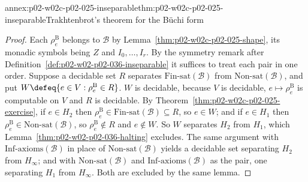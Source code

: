 \begin{annexitem}{annex:p02-w02c-p02-025-inseparable}{thm:p02-w02c-p02-025-inseparable}{Trakhtenbrot's theorem for the B\"uchi form}
\begin{proof}
Each \(\rho^{\mathrm B}_e\) belongs to \(\mathcal B\) by
Lemma~\ref{thm:p02-w02c-p02-025-shape}, its monadic symbols being \(Z\) and
\(I_0,\ldots,I_r\).  By the symmetry remark after
Definition~\ref{def:p02-w02-p02-036-inseparable} it suffices to treat each pair
in one order.  Suppose a decidable set \(R\) separates
\(\mathrm{Fin\text{-}sat}(\mathcal B)\) from \(\mathrm{Non\text{-}sat}(\mathcal B)\),
and put \(W\defeq\{e\in V:\rho^{\mathrm B}_e\in R\}\).  \(W\) is decidable,
because \(V\) is decidable, \(e\mapsto\rho^{\mathrm B}_e\) is computable on \(V\)
and \(R\) is decidable.  By Theorem~\ref{thm:p02-w02c-p02-025-exercise}, if
\(e\in H_2\) then \(\rho^{\mathrm B}_e\in\mathrm{Fin\text{-}sat}(\mathcal B)
\subseteq R\), so \(e\in W\); and if \(e\in H_1\) then
\(\rho^{\mathrm B}_e\in\mathrm{Non\text{-}sat}(\mathcal B)\), so
\(\rho^{\mathrm B}_e\notin R\) and \(e\notin W\).  So \(W\) separates \(H_2\) from
\(H_1\), which Lemma~\ref{thm:p02-w02-p02-036-halting} excludes.  The same
argument with \(\mathrm{Inf\text{-}axioms}(\mathcal B)\) in place of
\(\mathrm{Non\text{-}sat}(\mathcal B)\) yields a decidable set separating \(H_2\)
from \(H_\infty\); and with \(\mathrm{Non\text{-}sat}(\mathcal B)\) and
\(\mathrm{Inf\text{-}axioms}(\mathcal B)\) as the pair, one separating \(H_1\)
from \(H_\infty\).  Both are excluded by the same lemma.
\end{proof}
\end{annexitem}
